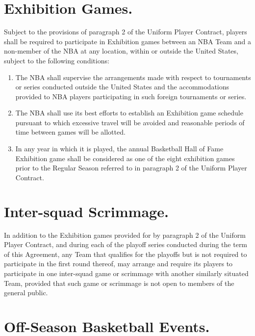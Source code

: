 \documentclass[
]{book}
\providecommand{\tightlist}{%
  \setlength{\itemsep}{0pt}\setlength{\parskip}{0pt}}
\begin{document}
\hypertarget{exhibition-games.}{%
\section{Exhibition Games.}\label{exhibition-games.}}

Subject to the provisions of paragraph 2 of the Uniform Player Contract, players shall be required to participate in Exhibition games between an NBA Team and a non-member of the NBA at any location, within or outside the United States, subject to the following conditions:

\begin{enumerate}
\def\labelenumi{(\alph{enumi})}
\tightlist
\item
  The NBA shall supervise the arrangements made with respect to tournaments or series conducted outside the United States and the accommodations provided to NBA players participating in such foreign tournaments or series.
\item
  The NBA shall use its best efforts to establish an Exhibition game schedule pursuant to which excessive travel will be avoided and reasonable periods of time between games will be allotted.
\item
  In any year in which it is played, the annual Basketball Hall of Fame Exhibition game shall be considered as one of the eight exhibition games prior to the Regular Season referred to in paragraph 2 of the Uniform Player Contract.
\end{enumerate}

\hypertarget{inter-squad-scrimmage.}{%
\section{Inter-squad Scrimmage.}\label{inter-squad-scrimmage.}}

In addition to the Exhibition games provided for by paragraph 2 of the Uniform Player Contract, and during each of the playoff series conducted during the term of this Agreement, any Team that qualifies for the playoffs but is not required to participate in the first round thereof, may arrange and require its players to participate in one inter-squad game or scrimmage with another similarly situated Team, provided that such game or scrimmage is not open to members of the general public.

\hypertarget{off-season-basketball-events.}{%
\section{Off-Season Basketball Events.}\label{off-season-basketball-events.}}
\end{document}
